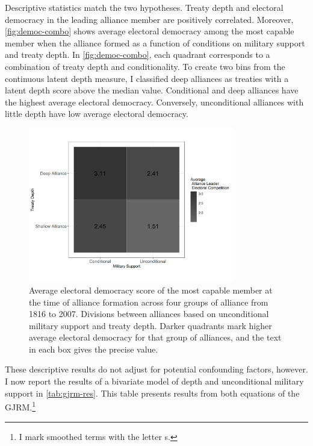 \documentclass[12pt]{article}
\begin{document}
Descriptive statistics match the two hypotheses.
Treaty depth and electoral democracy in the leading alliance member are positively correlated. 
Moreover, \autoref{fig:democ-combo} shows average electoral democracy among the most capable member when the alliance formed as a function of conditions on military support and treaty depth.
In \autoref{fig:democ-combo}, each quadrant corresponds to a combination of treaty depth and conditionality. 
To create two bins from the continuous latent depth measure, I classified deep alliances as treaties with a latent depth score above the median value. 
Conditional and deep alliances have the highest average electoral democracy. 
Conversely, unconditional alliances with little depth have low average electoral democracy.


\begin{figure}[hbtp]
\centering
\includegraphics[width=0.8\textwidth]{../figures/democ-combo.png}
\caption{Average electoral democracy score of the most capable member at the time of alliance formation across four groups of alliance from 1816 to 2007. Divisions between alliances based on unconditional military support and treaty depth. Darker quadrants mark higher average electoral democracy for that group of alliances, and the text in each box gives the precise value.}
\label{fig:democ-combo}
\end{figure}


These descriptive results do not adjust for potential confounding factors, however.
I now report the results of a bivariate model of depth and unconditional military support in \autoref{tab:gjrm-res}. 
This table presents results from both equations of the GJRM.\footnote{I mark smoothed terms with the letter s.} 
\end{document}
